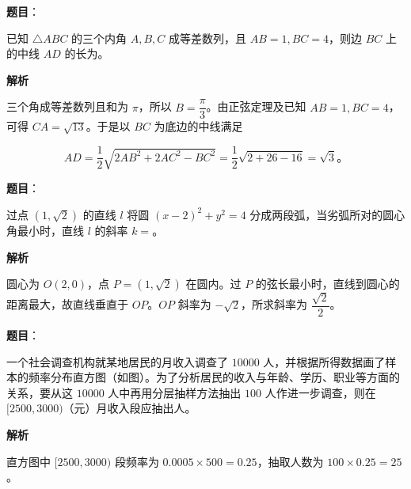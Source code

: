 \begin{answer}

\textbf{题目}：

已知 $\triangle ABC$ 的三个内角 $A,B,C$ 成等差数列，且 $AB=1,BC=4$，则边 $BC$ 上的中线 $AD$ 的长为\gkblank{}。

\textbf{解析}

三个角成等差数列且和为 $\pi$，所以 $B=\dfrac\pi3$。由正弦定理及已知 $AB=1,BC=4$，可得 $CA=\sqrt{13}$。于是以 $BC$ 为底边的中线满足

\nopagebreak[4]
\[
AD=\frac12\sqrt{2AB^2+2AC^2-BC^2}=\frac12\sqrt{2+26-16}=\sqrt3\text{。}
\]


\end{answer}
\begin{answer}

\textbf{题目}：

过点 $(1,\sqrt2)$ 的直线 $l$ 将圆 $(x-2)^2+y^2=4$ 分成两段弧，当劣弧所对的圆心角最小时，直线 $l$ 的斜率 $k=$\gkblank{}。

\textbf{解析}

圆心为 $O(2,0)$，点 $P=(1,\sqrt2)$ 在圆内。过 $P$ 的弦长最小时，直线到圆心的距离最大，故直线垂直于 $OP$。$OP$ 斜率为 $-\sqrt2$，所求斜率为 $\dfrac{\sqrt2}{2}$。


\end{answer}
\begin{answer}

\textbf{题目}：

一个社会调查机构就某地居民的月收入调查了 $10000$ 人，并根据所得数据画了样本的频率分布直方图（如图）。为了分析居民的收入与年龄、学历、职业等方面的关系，要从这 $10000$ 人中再用分层抽样方法抽出 $100$ 人作进一步调查，则在 $[2500,3000)$（元）月收入段应抽出\gkblank{}人。
\nopagebreak[4]
\begin{center}\end{center}
\nopagebreak[4]
\textbf{解析}

直方图中 $[2500,3000)$ 段频率为 $0.0005\times500=0.25$，抽取人数为 $100\times0.25=25$。


\end{answer}
